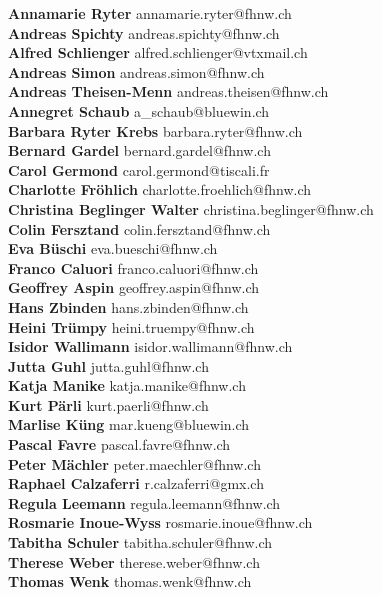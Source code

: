 \documentclass{scrartcl}
\begin{document}
\textbf{Annamarie Ryter } annamarie.ryter@fhnw.ch\\
\textbf{Andreas Spichty } andreas.spichty@fhnw.ch\\
\textbf{Alfred Schlienger } alfred.schlienger@vtxmail.ch\\
\textbf{Andreas Simon } andreas.simon@fhnw.ch\\
\textbf{Andreas Theisen-Menn } andreas.theisen@fhnw.ch\\
\textbf{Annegret Schaub } a_schaub@bluewin.ch\\
\textbf{Barbara Ryter Krebs } barbara.ryter@fhnw.ch\\
\textbf{Bernard Gardel } bernard.gardel@fhnw.ch\\
\textbf{Carol Germond } carol.germond@tiscali.fr\\
\textbf{Charlotte Fröhlich } charlotte.froehlich@fhnw.ch\\
\textbf{Christina Beglinger Walter } christina.beglinger@fhnw.ch\\
\textbf{Colin Fersztand } colin.fersztand@fhnw.ch\\
\textbf{Eva Büschi } eva.bueschi@fhnw.ch\\
\textbf{Franco Caluori } franco.caluori@fhnw.ch\\
\textbf{Geoffrey Aspin } geoffrey.aspin@fhnw.ch\\
\textbf{Hans Zbinden } hans.zbinden@fhnw.ch\\
\textbf{Heini Trümpy } heini.truempy@fhnw.ch\\
\textbf{Isidor Wallimann } isidor.wallimann@fhnw.ch\\
\textbf{Jutta Guhl } jutta.guhl@fhnw.ch\\
\textbf{Katja Manike } katja.manike@fhnw.ch\\
\textbf{Kurt Pärli } kurt.paerli@fhnw.ch\\
\textbf{Marlise Küng } mar.kueng@bluewin.ch\\
\textbf{Pascal Favre } pascal.favre@fhnw.ch\\
\textbf{Peter Mächler } peter.maechler@fhnw.ch\\
\textbf{Raphael Calzaferri } r.calzaferri@gmx.ch\\
\textbf{Regula Leemann } regula.leemann@fhnw.ch\\
\textbf{Rosmarie Inoue-Wyss } rosmarie.inoue@fhnw.ch\\
\textbf{Tabitha Schuler } tabitha.schuler@fhnw.ch\\
\textbf{Therese Weber } therese.weber@fhnw.ch\\
\textbf{Thomas Wenk } thomas.wenk@fhnw.ch\\
\end{document}
